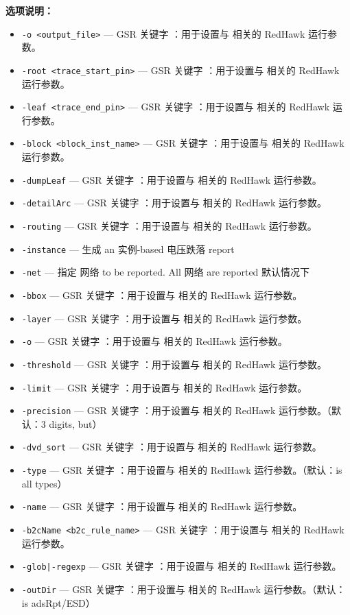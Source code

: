 \textbf{选项说明：}
\begin{itemize}
\item \texttt{-o <output\_file>} — GSR 关键字 ：用于设置与  相关的 RedHawk 运行参数。
\item \texttt{-root <trace\_start\_pin>} — GSR 关键字 ：用于设置与  相关的 RedHawk 运行参数。
\item \texttt{-leaf <trace\_end\_pin>} — GSR 关键字 ：用于设置与  相关的 RedHawk 运行参数。
\item \texttt{-block <block\_inst\_name>} — GSR 关键字 ：用于设置与  相关的 RedHawk 运行参数。
\item \texttt{-dumpLeaf} — GSR 关键字 ：用于设置与  相关的 RedHawk 运行参数。
\item \texttt{-detailArc} — GSR 关键字 ：用于设置与  相关的 RedHawk 运行参数。
\item \texttt{-routing} — GSR 关键字 ：用于设置与  相关的 RedHawk 运行参数。
\item \texttt{-instance} — 生成 an 实例-based 电压跌落 report
\item \texttt{-net} — 指定 网络 to be reported. All 网络 are reported 默认情况下
\item \texttt{-bbox} — GSR 关键字 ：用于设置与  相关的 RedHawk 运行参数。
\item \texttt{-layer} — GSR 关键字 ：用于设置与  相关的 RedHawk 运行参数。
\item \texttt{-o} — GSR 关键字 ：用于设置与  相关的 RedHawk 运行参数。
\item \texttt{-threshold} — GSR 关键字 ：用于设置与  相关的 RedHawk 运行参数。
\item \texttt{-limit} — GSR 关键字 ：用于设置与  相关的 RedHawk 运行参数。
\item \texttt{-precision} — GSR 关键字 ：用于设置与  相关的 RedHawk 运行参数。（默认：3 digits, but）
\item \texttt{-dvd\_sort} — GSR 关键字 ：用于设置与  相关的 RedHawk 运行参数。
\item \texttt{-type} — GSR 关键字 ：用于设置与  相关的 RedHawk 运行参数。（默认：is all types）
\item \texttt{-name} — GSR 关键字 ：用于设置与  相关的 RedHawk 运行参数。
\item \texttt{-b2cName <b2c\_rule\_name>} — GSR 关键字 ：用于设置与  相关的 RedHawk 运行参数。
\item \texttt{-glob|-regexp} — GSR 关键字 ：用于设置与  相关的 RedHawk 运行参数。
\item \texttt{-outDir} — GSR 关键字 ：用于设置与  相关的 RedHawk 运行参数。（默认：is adsRpt/ESD）

\end{itemize}
